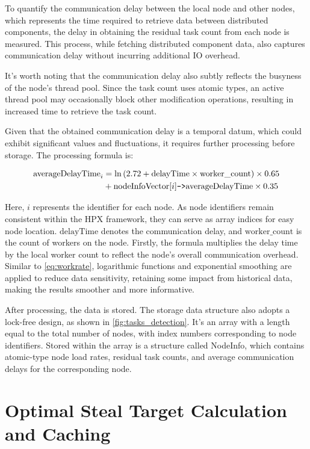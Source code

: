 \documentclass{mproj}
\begin{document}
To quantify the communication delay between the local node and other nodes,
which represents the time required to retrieve data between distributed components,
the delay in obtaining the residual task count from each node is measured.
This process, while fetching distributed component data,
also captures communication delay without incurring additional IO overhead.

It's worth noting that the communication delay also subtly reflects the busyness of the node's thread pool.
Since the task count uses atomic types,
an active thread pool may occasionally block other modification operations,
resulting in increased time to retrieve the task count.

Given that the obtained communication delay is a temporal datum,
which could exhibit significant values and fluctuations, it requires further processing before storage.
The processing formula is:

\begin{align}
    \text{averageDelayTime}_i & = \ln\left(2.72 + \text{delayTime} \times \text{worker\_count}\right) \times 0.65 \notag               \\
                              & + \text{nodeInfoVector}[i]\texttt{->}\text{averageDelayTime} \times 0.35   \label{eq:averageDelayTime}
\end{align}

Here, $i$ represents the identifier for each node.
As node identifiers remain consistent within the HPX framework,
they can serve as array indices for easy node location.
$\text{delayTime}$ denotes the communication delay, and $\text{worker\_count}$ is the count of workers on the node.
Firstly, the formula multiplies the delay time by the local worker count to reflect the node's overall communication overhead.
Similar to \ref{eq:workrate}, logarithmic functions and exponential smoothing are applied to reduce data sensitivity,
retaining some impact from historical data,
making the results smoother and more informative.

After processing, the data is stored.
The storage data structure also adopts a lock-free design,
as shown in \ref{fig:tasks_detection}.
It's an array with a length equal to the total number of nodes,
with index numbers corresponding to node identifiers.
Stored within the array is a structure called NodeInfo,
which contains atomic-type node load rates, residual task counts, and average communication delays for the corresponding node.

\section{Optimal Steal Target Calculation and Caching}
\end{document}
